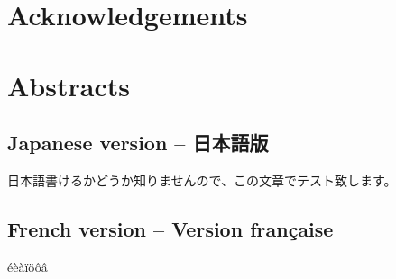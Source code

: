 \chapter*{Acknowledgements}

\chapter*{Abstracts}
\section*{Japanese version -- 日本語版}
日本語書けるかどうか知りませんので、この文章でテスト致します。
\section*{French version -- Version française}
éèàïöôâ